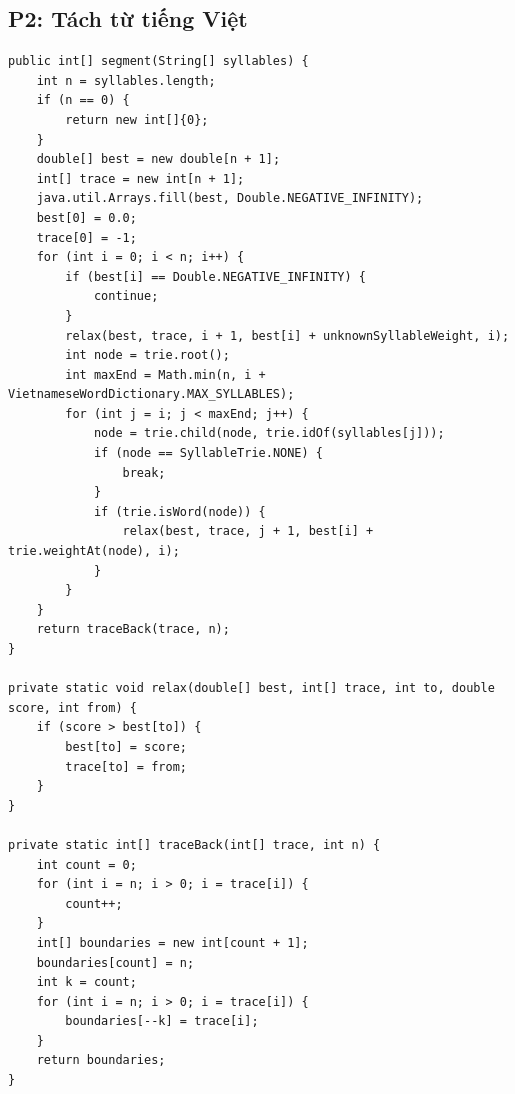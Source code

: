 \documentclass[9pt,twocolumn,a4paper]{extarticle}
\newcommand{\code}[1]{\texttt{#1}}
\begin{document}
\subsection{P2: Tách từ tiếng Việt}
\begin{minipage}{\linewidth}
\begin{lstlisting}[caption={\code{index/MaxWeightSegmenter.java}, \code{segment}, \code{relax}, \code{traceBack}: quy hoạch động tách từ},label={lst:segment}]
public int[] segment(String[] syllables) {
    int n = syllables.length;
    if (n == 0) {
        return new int[]{0};
    }
    double[] best = new double[n + 1];
    int[] trace = new int[n + 1];
    java.util.Arrays.fill(best, Double.NEGATIVE_INFINITY);
    best[0] = 0.0;
    trace[0] = -1;
    for (int i = 0; i < n; i++) {
        if (best[i] == Double.NEGATIVE_INFINITY) {
            continue;
        }
        relax(best, trace, i + 1, best[i] + unknownSyllableWeight, i);
        int node = trie.root();
        int maxEnd = Math.min(n, i + VietnameseWordDictionary.MAX_SYLLABLES);
        for (int j = i; j < maxEnd; j++) {
            node = trie.child(node, trie.idOf(syllables[j]));
            if (node == SyllableTrie.NONE) {
                break;
            }
            if (trie.isWord(node)) {
                relax(best, trace, j + 1, best[i] + trie.weightAt(node), i);
            }
        }
    }
    return traceBack(trace, n);
}

private static void relax(double[] best, int[] trace, int to, double score, int from) {
    if (score > best[to]) {
        best[to] = score;
        trace[to] = from;
    }
}

private static int[] traceBack(int[] trace, int n) {
    int count = 0;
    for (int i = n; i > 0; i = trace[i]) {
        count++;
    }
    int[] boundaries = new int[count + 1];
    boundaries[count] = n;
    int k = count;
    for (int i = n; i > 0; i = trace[i]) {
        boundaries[--k] = trace[i];
    }
    return boundaries;
}
\end{lstlisting}
\end{minipage}
\par\vspace{4pt}
\end{document}
